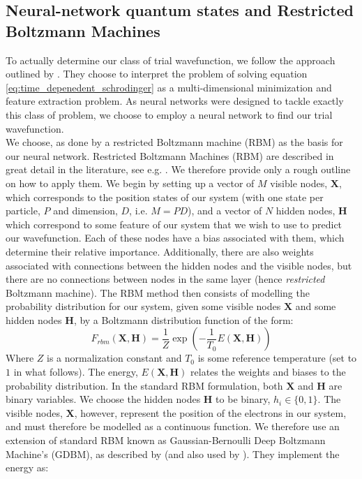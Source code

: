 \documentclass[a4paper, 10pt]{article}
\begin{document}
	\subsection{Neural-network quantum states and Restricted Boltzmann Machines}
	To actually determine our class of trial wavefunction, we follow the approach outlined by \cite{Carleo602}. They choose to interpret the problem of solving equation \ref{eq:time_depenedent_schrodinger} as a multi-dimensional minimization and feature extraction problem. As neural networks were designed to tackle exactly this class of problem, we choose to employ a neural network to find our trial wavefunction.\\
	\linebreak
	We choose, as done by \cite{Carleo602} a restricted Boltzmann machine (RBM) as the basis for our neural network. Restricted Boltzmann Machines (RBM) are described in great detail in the literature, see e.g. \cite{Hinton2010}. We therefore provide only a rough outline on how to apply them. We begin by setting up a vector of $M$ visible nodes, $\mathbf{X}$, which corresponds to the position states of our system (with one state per particle, $P$ and dimension, $D$, i.e. $M=PD$), and a vector of $N$ hidden nodes, $\mathbf{H}$ which correspond to some feature of our system that we wish to use to predict our wavefunction. Each of these nodes have a bias associated with them, which determine their relative importance. Additionally, there are also weights associated with connections between the hidden nodes and the visible nodes, but there are no connections between nodes in the same layer (hence \textit{restricted} Boltzmann machine). The RBM method then consists of modelling the probability distribution for our system, given some visible nodes $\mathbf{X}$ and some hidden nodes $\mathbf{H}$, by a Boltzmann distribution function of the form:
	\begin{equation}
	F_{rbm}(\mathbf{X}, \mathbf{H})=\frac{1}{Z}\exp \left(-\frac{1}{T_0}E(\mathbf{X},\mathbf{H})\right)
	\end{equation}
	Where $Z$ is a normalization constant and $T_0$ is some reference temperature (set to $1$ in what follows). The energy, $E(\boldsymbol{X}, \boldsymbol{H})$ relates the weights and biases to the probability distribution. In the standard RBM formulation, both $\boldsymbol{X}$ and $\boldsymbol{H}$ are binary variables. We choose the hidden nodes $\boldsymbol{H}$ to be binary, $h_i \in \{0,1\}$. The visible nodes, $\boldsymbol{X}$, however, represent the position of the electrons in our system, and must therefore be modelled as a continuous function. We therefore use an extension of standard RBM known as Gaussian-Bernoulli Deep Boltzmann Machine's (GDBM), as described by \cite{Wang2014} (and also used by \cite{Carleo602}). They implement the energy as:
\end{document}
